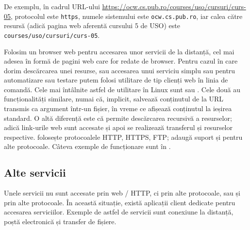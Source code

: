 De exemplu, în cadrul URL-ului \url{https://ocw.cs.pub.ro/courses/uso/cursuri/curs-05}, protocolul este \texttt{https}, numele sistemului este \texttt{ocw.cs.pub.ro}, iar calea către resursă (adică pagina web aferentă cursului 5 de USO) este \texttt{courses/uso/cursuri/curs-05}.

Folosim un browser web pentru accesarea unor servicii de la distanță, cel mai adesea în formă de pagini web care for redate de browser.
Pentru cazul în care dorim descărcarea unei resurse, sau accesarea unui serviciu simplu sau pentru automatizare sau testare putem folosi utilitare de tip clienți web în linia de comandă.
Cele mai întâlnite astfel de utilitare în Linux sunt  sau .
Cele două au funcționalități similare, numai că, implicit,  salvează conținutul de la URL transmis ca argument într-un fișier, în vreme ce  afișează conținutul la ieșirea standard.
O altă diferență este că  permite descărcarea recursivă a resurselor; adică link-urile web sunt accesate și apoi se realizează transferul și resurselor respective.
 folosește protocoalele HTTP, HTTPS, FTP;  adaugă suport și pentru alte protocoale.
Câteva exemple de funcționare sunt în .


\subsection{Alte servicii}
\label{sec:net:apps:other}

Unele servicii nu sunt accesate prin web / HTTP, ci prin alte protocoale, sau și prin alte protocoale.
În această situație, există aplicații client dedicate pentru accesarea serviciilor.
Exemple de astfel de servicii sunt conexiune la distanță, poștă electronică și transfer de fișiere.

